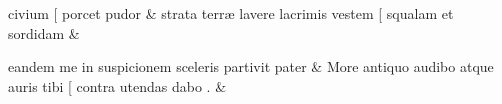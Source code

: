 \documentclass[12pt,onecolumn,twoside,a4paper]{memoir}
\begin{document}
\begin{pairs}
\begin{Leftside}
                              civium
                              [
                              porcet
                              pudor \&
                         \stanza {}
                     strata
                              terræ
                              lavere
                              lacrimis
                              vestem
                              [
                              squalam
                              et
                              sordidam \&
                         \stanza {}
                     
                              eandem
                              me
                              in
                              suspicionem
                              sceleris
                              partivit
                              pater \&
                         \stanza {}
                     More
                              antiquo
                              audibo
                              atque
                              auris
                              tibi
                              [
                              contra
                              utendas
                              dabo
                              . \&
                     
                  \endnumbering
		\end{Leftside}
                  \begin{Rightside}
			\beginnumbering
			\numberstanzafalse
                     

\end{Rightside}
\end{pairs}
\end{document}
